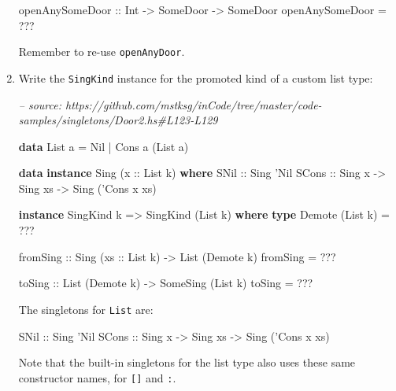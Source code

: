 \documentclass[]{article}
\newenvironment{Shaded}{}{}
\newcommand{\CommentTok}[1]{\textcolor[rgb]{0.38,0.63,0.69}{\textit{#1}}}
\newcommand{\DataTypeTok}[1]{\textcolor[rgb]{0.56,0.13,0.00}{#1}}
\newcommand{\KeywordTok}[1]{\textcolor[rgb]{0.00,0.44,0.13}{\textbf{#1}}}
\newcommand{\NormalTok}[1]{#1}
\newcommand{\OperatorTok}[1]{\textcolor[rgb]{0.40,0.40,0.40}{#1}}
\newcommand{\OtherTok}[1]{\textcolor[rgb]{0.00,0.44,0.13}{#1}}
\begin{document}
\begin{enumerate}
\begin{Shaded}
\begin{Highlighting}[]
\OtherTok{openAnySomeDoor ::} \DataTypeTok{Int} \OtherTok{->} \DataTypeTok{SomeDoor} \OtherTok{->} \DataTypeTok{SomeDoor}
\NormalTok{openAnySomeDoor }\OtherTok{=} \OperatorTok{???}
\end{Highlighting}
\end{Shaded}

  Remember to re-use \texttt{openAnyDoor}.
\item
  Write the \texttt{SingKind} instance for the promoted kind of a custom list
  type:

\begin{Shaded}
\begin{Highlighting}[]
\CommentTok{-- source: https://github.com/mstksg/inCode/tree/master/code-samples/singletons/Door2.hs#L123-L129}

\KeywordTok{data} \DataTypeTok{List}\NormalTok{ a }\OtherTok{=} \DataTypeTok{Nil} \OperatorTok{|} \DataTypeTok{Cons}\NormalTok{ a (}\DataTypeTok{List}\NormalTok{ a)}

\KeywordTok{data} \KeywordTok{instance} \DataTypeTok{Sing}\NormalTok{ (}\OtherTok{x ::} \DataTypeTok{List}\NormalTok{ k) }\KeywordTok{where}
    \DataTypeTok{SNil}\OtherTok{  ::} \DataTypeTok{Sing} \DataTypeTok{'Nil}
    \DataTypeTok{SCons}\OtherTok{ ::} \DataTypeTok{Sing}\NormalTok{ x }\OtherTok{->} \DataTypeTok{Sing}\NormalTok{ xs }\OtherTok{->} \DataTypeTok{Sing}\NormalTok{ (}\DataTypeTok{'Cons}\NormalTok{ x xs)}

\KeywordTok{instance} \DataTypeTok{SingKind}\NormalTok{ k }\OtherTok{=>} \DataTypeTok{SingKind}\NormalTok{ (}\DataTypeTok{List}\NormalTok{ k) }\KeywordTok{where}
    \KeywordTok{type} \DataTypeTok{Demote}\NormalTok{ (}\DataTypeTok{List}\NormalTok{ k) }\OtherTok{=} \OperatorTok{???}

\OtherTok{    fromSing ::} \DataTypeTok{Sing}\NormalTok{ (}\OtherTok{xs ::} \DataTypeTok{List}\NormalTok{ k) }\OtherTok{->} \DataTypeTok{List}\NormalTok{ (}\DataTypeTok{Demote}\NormalTok{ k)}
\NormalTok{    fromSing }\OtherTok{=} \OperatorTok{???}

\OtherTok{    toSing ::} \DataTypeTok{List}\NormalTok{ (}\DataTypeTok{Demote}\NormalTok{ k) }\OtherTok{->} \DataTypeTok{SomeSing}\NormalTok{ (}\DataTypeTok{List}\NormalTok{ k)}
\NormalTok{    toSing }\OtherTok{=} \OperatorTok{???}
\end{Highlighting}
\end{Shaded}

  The singletons for \texttt{List} are:

\begin{Shaded}
\begin{Highlighting}[]
\DataTypeTok{SNil}\OtherTok{  ::} \DataTypeTok{Sing} \DataTypeTok{'Nil}
\DataTypeTok{SCons}\OtherTok{ ::} \DataTypeTok{Sing}\NormalTok{ x }\OtherTok{->} \DataTypeTok{Sing}\NormalTok{ xs }\OtherTok{->} \DataTypeTok{Sing}\NormalTok{ (}\DataTypeTok{'Cons}\NormalTok{ x xs)}
\end{Highlighting}
\end{Shaded}

  Note that the built-in singletons for the list type also uses these same
  constructor names, for \texttt{{[}{]}} and \texttt{:}.
\end{enumerate}
\end{document}

